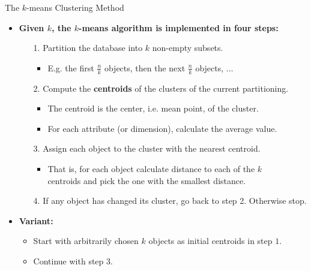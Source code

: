 \begin{frame}{The $k$-means Clustering Method}
	\begin{itemize}
		\item \textbf{Given $k$, the $k$-means algorithm is implemented in four
			      steps:}
		      \begin{itemize}
			      \item[1.] Partition the database into $k$ non-empty subsets.
				      \begin{itemize}
					      \item E.g. the first $\frac{n}{k}$ objects, then the next
					            $\frac{n}{k}$ objects, $\ldots$
				      \end{itemize}
			      \item[2.] Compute the \textbf{\color{airforceblue}centroids} of the clusters of the
				      current partitioning.
				      \begin{itemize}
					      \item The centroid is the center, i.e. mean point, of the
					            cluster.
					      \item For each attribute (or dimension), calculate the average
					            value.
				      \end{itemize}
			      \item[3.] Assign each object to the cluster with the nearest
				      centroid.
				      \begin{itemize}
					      \item That is, for each object calculate distance to each of
					            the $k$\\
					            centroids and pick the one with the smallest distance.
				      \end{itemize}
			      \item[4.] If any object has changed its cluster, go back to step 2.
				      Otherwise stop.
		      \end{itemize}
		\item \textbf{Variant:}
		      \begin{itemize}
			      \item Start with arbitrarily chosen $k$ objects as initial
			            centroids in step $1$.
			      \item Continue with step $3$.
		      \end{itemize}
	\end{itemize}
\end{frame}

